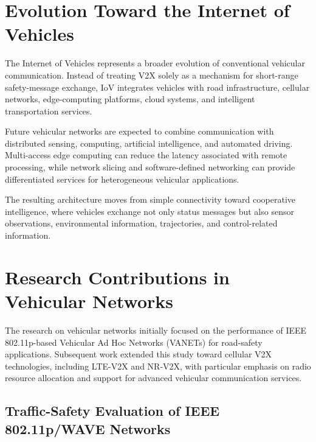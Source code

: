 \section{Evolution Toward the Internet of Vehicles}
\label{sec:iov}

The Internet of Vehicles represents a broader evolution of conventional
vehicular communication. Instead of treating V2X solely as a mechanism for
short-range safety-message exchange, IoV integrates vehicles with road
infrastructure, cellular networks, edge-computing platforms, cloud systems,
and intelligent transportation services.

Future vehicular networks are expected to combine communication with
distributed sensing, computing, artificial intelligence, and automated
driving. Multi-access edge computing can reduce the latency associated with
remote processing, while network slicing and software-defined networking can
provide differentiated services for heterogeneous vehicular applications.

The resulting architecture moves from simple connectivity toward
cooperative intelligence, where vehicles exchange not only status messages
but also sensor observations, environmental information, trajectories, and
control-related information.


\section{Research Contributions in Vehicular Networks}
\label{sec:vehicular_research_contributions}

The research on vehicular networks initially focused on the
performance of IEEE 802.11p-based Vehicular Ad Hoc Networks
(VANETs) for road-safety applications. Subsequent work extended
this study toward cellular V2X technologies, including LTE-V2X
and NR-V2X, with particular emphasis on radio resource
allocation and support for advanced vehicular communication
services.

\subsection{Traffic-Safety Evaluation of IEEE 802.11p/WAVE Networks}
\label{subsec:wave_safety_evaluation}

